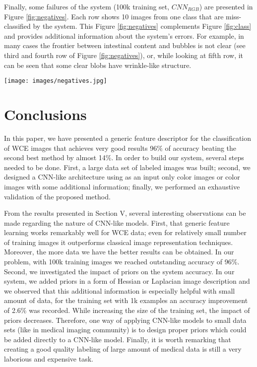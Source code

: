 \documentclass[review,12pt,3p]{elsarticle}
\begin{document}
Finally, some failures of the system (100k training set, $CNN_{RGB}$) are presented in Figure \ref{fig:negatives}. Each row shows 10 images from one class that are miss-classified by the system. This Figure \ref{fig:negatives} complements Figure \ref{fig:class} and provides additional information about the system's errors. For example, in many cases the frontier between intestinal content and bubbles is not clear (see third and fourth row of Figure \ref{fig:negatives}), or, while looking at fifth row, it can be seen that some clear blobs have wrinkle-like structure.

\begin{figure*}[!ht]
\centering
\texttt{[image: images/negatives.jpg]}
\caption{Images, where the proposed system fails. Each row contains sample images from one event and at the top of the images, the predicted label is printed. }
\label{fig:negatives}
\end{figure*}

\section{Conclusions}

In this paper, we have presented a generic feature descriptor for the classification of WCE images that achieves very good results 96\% of accuracy beating the second best method by almost 14\%. In order to build our system, several steps needed to be done. First, a large data set of labeled images was built; second, we designed a CNN-like architecture using as an input only color images or color images with some additional information; finally, we performed an exhaustive validation of the proposed method.

From the results presented in Section V, several interesting observations can be made regarding the nature of CNN-like models. First, that generic feature learning works remarkably well for WCE data; even for relatively small number of training images it outperforms classical image representation techniques. Moreover, the more data we have the better results can be obtained. In our problem, with 100k training images we reached outstanding accuracy of 96\%. Second, we investigated the impact of priors on the system accuracy. In our system, we added priors in a form of Hessian or Laplacian image description and we observed that this additional information is especially helpful with small amount of data, for the training set with 1k examples an accuracy improvement of 2.6\% was recorded. While increasing the size of the training set, the impact of priors decreases. Therefore, one way of applying CNN-like models to small data sets (like in medical imaging community) is to design proper priors which could be added directly to a CNN-like model. Finally, it is worth remarking that creating a good quality labeling of large amount of medical data is still a very laborious and expensive task.
\end{document}
